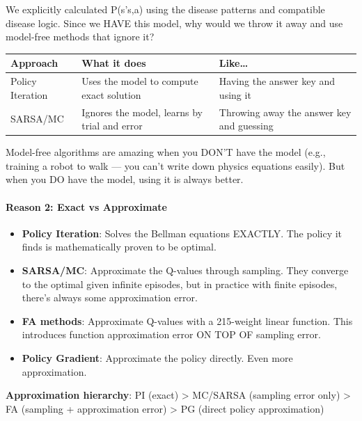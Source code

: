 \documentclass[
]{article}
\providecommand{\tightlist}{%
  \setlength{\itemsep}{0pt}\setlength{\parskip}{0pt}}
\begin{document}
We explicitly calculated P(s'\textbar s,a) using the disease patterns
and compatible disease logic. Since we HAVE this model, why would we
throw it away and use model-free methods that ignore it?

\begin{longtable}[]{@{}
  >{\raggedright\arraybackslash}p{}
  >{\raggedright\arraybackslash}p{}
  >{\raggedright\arraybackslash}p{}@{}}
\toprule
Approach & What it does & Like\ldots{} \\
\midrule
\endhead
Policy Iteration & Uses the model to compute exact solution & Having the
answer key and using it \\
SARSA/MC & Ignores the model, learns by trial and error & Throwing away
the answer key and guessing \\
\bottomrule
\end{longtable}

Model-free algorithms are amazing when you DON'T have the model (e.g.,
training a robot to walk --- you can't write down physics equations
easily). But when you DO have the model, using it is always better.

\hypertarget{reason-2-exact-vs-approximate}{%
\paragraph{Reason 2: Exact vs
Approximate}\label{reason-2-exact-vs-approximate}}

\begin{itemize}
\tightlist
\item
  \textbf{Policy Iteration}: Solves the Bellman equations EXACTLY. The
  policy it finds is mathematically proven to be optimal.
\item
  \textbf{SARSA/MC}: Approximate the Q-values through sampling. They
  converge to the optimal given infinite episodes, but in practice with
  finite episodes, there's always some approximation error.
\item
  \textbf{FA methods}: Approximate Q-values with a 215-weight linear
  function. This introduces function approximation error ON TOP OF
  sampling error.
\item
  \textbf{Policy Gradient}: Approximate the policy directly. Even more
  approximation.
\end{itemize}

\textbf{Approximation hierarchy}: PI (exact) \textgreater{} MC/SARSA
(sampling error only) \textgreater{} FA (sampling + approximation error)
\textgreater{} PG (direct policy approximation)
\end{document}
